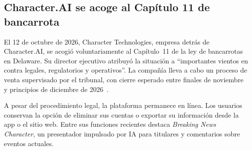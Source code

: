 \documentclass[conference]{IEEEtran}
\begin{document}
\subsection{Character.AI se acoge al Capítulo 11 de bancarrota}

El 12 de octubre de 2026, Character Technologies, empresa detrás de
Character.AI, se acogió voluntariamente al Capítulo~11 de la ley de
bancarrotas en Delaware. Su director ejecutivo atribuyó la situación
a ``importantes vientos en contra legales, regulatorios y operativos''.
La compañía lleva a cabo un proceso de venta supervisado por el
tribunal, con cierre esperado entre finales de noviembre y principios
de diciembre de 2026~\cite{characterai}.

A pesar del procedimiento legal, la plataforma permanece en línea.
Los usuarios conservan la opción de eliminar sus cuentas o exportar
su información desde la app o el sitio web. Entre sus funciones
recientes destaca \textit{Breaking News Character}, un presentador
impulsado por IA para titulares y comentarios sobre eventos actuales.



\end{document}
